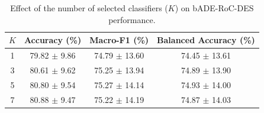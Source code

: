 \begin{table}[t]
\centering
\caption{Effect of the number of selected classifiers ($K$) on bADE-RoC-DES performance.}
\label{tab:topk_ablation}
\begin{tabular}{c|ccc}
\hline
$K$ & Accuracy (\%) & Macro-F1 (\%) & Balanced Accuracy (\%)\\
\hline
1 & 79.82 $\pm$ 9.86 & 74.79 $\pm$ 13.60 & 74.45 $\pm$ 13.61 \\
3 & 80.61 $\pm$ 9.62 & 75.25 $\pm$ 13.94 & 74.89 $\pm$ 13.90 \\
5 & 80.80 $\pm$ 9.54 & 75.27 $\pm$ 14.14 & 74.93 $\pm$ 14.00 \\
7 & 80.88 $\pm$ 9.47 & 75.22 $\pm$ 14.19 & 74.87 $\pm$ 14.03 \\
\hline
\end{tabular}
\end{table}
